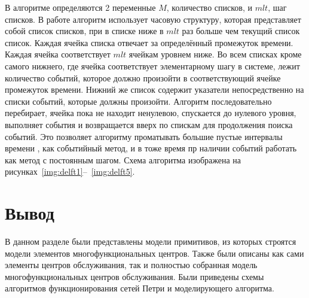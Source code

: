 В алгоритме определяются 2 переменные $M$, количество списков, и $mlt$, шаг списков. В работе алгоритм использует часовую структуру, которая представляет собой список списков, при в списке ниже в $mlt$ раз больше чем текущий список список. Каждая ячейка списка отвечает за определённый промежуток времени. Каждая ячейка соответствует $mlt$ ячейкам уровнем ниже. Во всем списках кроме самого нижнего, где ячейка соответствует элементарному шагу в системе, лежит количество событий, которое должно произойти в соответствующий ячейке промежуток времени. Нижний же список содержит указатели непосредственно на списки событий, которые должны произойти. Алгоритм последовательно перебирает, ячейка пока не находит ненулевою, спускается до нулевого уровня, выполняет события и возвращается вверх по спискам для продолжения поиска событий. Это позволяет алгоритму проматывать большие пустые интервалы времени , как событийный метод, и в тоже время пр наличии событий работать как метод с постоянным шагом. Схема алгоритма изображена на рисунках~\ref{img:delft1}--~\ref{img:delft5}.

\FloatBarrier

\FloatBarrier

\FloatBarrier

\FloatBarrier

\FloatBarrier

\section*{Вывод}

В данном разделе были представлены модели примитивов, из которых строятся модели элементов многофункциональных центров. Также были описаны как сами элементы центров обслуживания, так и полностью собранная модель  многофункциональных центров обслуживания. Были приведены схемы алгоритмов функционирования сетей Петри и моделирующего алгоритма. 